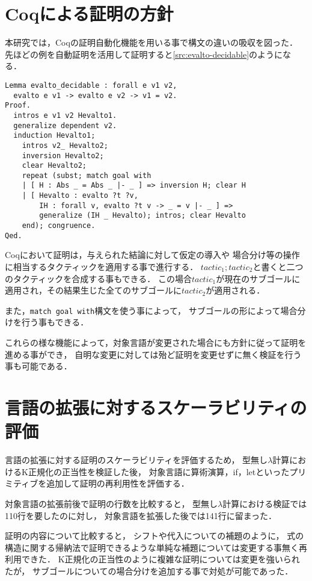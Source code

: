 \documentclass{sumiilab-paper}
\begin{document}
\section{Coqによる証明の方針}
本研究では，Coqの証明自動化機能を用いる事で構文の違いの吸収を図った．
先ほどの例を自動証明を活用して証明すると\lstlistingname\ref{src:evalto-decidable}のようになる．
\begin{lstlisting}[caption=自動証明の活用例,label=src:evalto-decidable]
Lemma evalto_decidable : forall e v1 v2,
  evalto e v1 -> evalto e v2 -> v1 = v2.
Proof.
  intros e v1 v2 Hevalto1.
  generalize dependent v2.
  induction Hevalto1;
    intros v2_ Hevalto2;
    inversion Hevalto2;
    clear Hevalto2;
    repeat (subst; match goal with
    | [ H : Abs _ = Abs _ |- _ ] => inversion H; clear H
    | [ Hevalto : evalto ?t ?v,
        IH : forall v, evalto ?t v -> _ = v |- _ ] =>
        generalize (IH _ Hevalto); intros; clear Hevalto
    end); congruence.
Qed.
\end{lstlisting}

Coqにおいて証明は，与えられた結論に対して仮定の導入や
場合分け等の操作に相当するタクティックを適用する事で進行する\cite{09thecoq}．
$\mathit{tactic}_1;\mathit{tactic}_2$と書くと二つのタクティックを合成する事もできる．
この場合$\mathit{tactic}_1$が現在のサブゴールに適用され，その結果生じた全てのサブゴールに$\mathit{tactic}_2$が適用される．

また，\lstinline|match goal with|構文を使う事によって，
サブゴールの形によって場合分けを行う事もできる．

これらの様な機能によって，対象言語が変更された場合にも方針に従って証明を進める事ができ，
自明な変更に対しては殆ど証明を変更せずに無く検証を行う事も可能である．

\section{言語の拡張に対するスケーラビリティの評価}
言語の拡張に対する証明のスケーラビリティを評価するため，
型無し$\lambda$計算におけるK正規化の正当性を検証した後，
対象言語に算術演算，if，letといったプリミティブを追加して証明の再利用性を評価する．

対象言語の拡張前後で証明の行数を比較すると，
型無し$\lambda$計算における検証では110行を要したのに対し，
対象言語を拡張した後では141行に留まった．

証明の内容について比較すると，
シフトや代入についての補題のように，
式の構造に関する帰納法で証明できるような単純な補題については変更する事無く再利用できた．
K正規化の正当性のように複雑な証明については変更を強いられたが，
サブゴールについての場合分けを追加する事で対処が可能であった．
\end{document}
